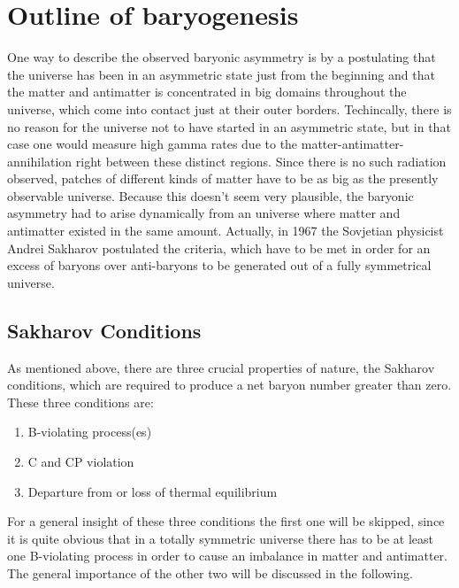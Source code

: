 \chapter{Outline of baryogenesis}
One way to describe the observed baryonic asymmetry is by a postulating that the universe has been in an asymmetric state just from the beginning and that the matter and antimatter is concentrated in big domains throughout the universe, which come into contact just at their outer borders. Techincally, there is no reason for the universe not to have started in an asymmetric state, but in that case one would measure high gamma rates due to the matter-antimatter-annihilation right between these distinct regions. \newline
Since there is no such radiation observed, patches of different kinds of matter have to be as big as the presently observable universe. Because this doesn't seem very plausible, the baryonic asymmetry had to arise dynamically from an universe where matter and antimatter existed in the same amount. \newline
Actually, in 1967 the Sovjetian physicist Andrei Sakharov postulated the criteria, which have to be met in order for an excess of baryons over anti-baryons to be generated out of a fully symmetrical universe.
\section{Sakharov Conditions}
As mentioned above, there are three crucial properties of nature, the Sakharov conditions, which are required to produce a net baryon number greater than zero. These three conditions are:
\begin{enumerate}
	\item B-violating process(es)
	\item C and CP violation
	\item Departure from or loss of thermal equilibrium
\end{enumerate}
For a general insight of these three conditions the first one will be skipped, since it is quite obvious that in a totally symmetric universe there has to be at least one B-violating process in order to cause an imbalance in matter and antimatter. \newline
The general importance of the other two will be discussed in the following.
